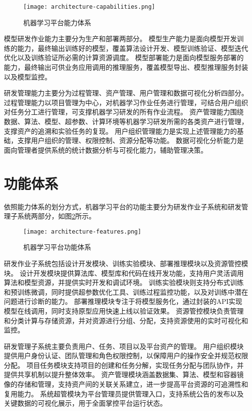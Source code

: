\begin{figure}
  \centering
  \texttt{[image: architecture-capabilities.png]}
  \caption{机器学习平台能力体系}
  \label{fig:architecture-capabilities}
\end{figure}

模型研发作业能力主要分为生产和部署两部分。
模型生产能力是面向模型开发训练的能力，最终输出训练好的模型，覆盖算法设计开发、模型训练验证、模型迭代优化以及训练验证所必需的计算资源调度。
模型部署能力是面向模型服务部署的能力，最终输出可供业务应用调用的推理服务，覆盖模型导出、模型推理服务封装以及模型监控。

研发管理能力主要分为过程管理、资产管理、用户管理和数据可视化分析四部分。
过程管理能力以项目管理为中心，对机器学习作业任务进行管理，可结合用户组织对任务分工进行管理，可支撑机器学习研发的所有作业流程。
资产管理能力围绕数据、算法、模型、超参数、计算环境等机器学习研发所需的各类资产进行管理，支撑资产的追溯和实验任务的复现。
用户组织管理能力是实现上述管理能力的基础，支撑用户组织的管理、权限控制、资源分配等功能。
数据可视化分析能力是面向管理者提供系统的统计数据分析与可视化能力，辅助管理决策。


\section{功能体系}

依照能力体系的划分方式，机器学习平台的功能主要分为研发作业子系统和研发管理子系统两部分，如图\ref{fig:architecture-features}所示。

\begin{figure}
  \centering
  \texttt{[image: architecture-features.png]}
  \caption{机器学习平台功能体系}
  \label{fig:architecture-features}
\end{figure}

研发作业子系统包括设计开发模块、训练实验模块、部署推理模块以及资源管控模块。
设计开发模块提供算法库、模型库和代码在线开发功能，支持用户灵活调用算法和模型资源，并提供实时开发和调试环境。
训练实验模块则支持分布式训练和预训练微调，同时提供超参数优化工具、训练过程监控功能，以及对训练中潜在问题进行诊断的能力。
部署推理模块专注于将模型服务化，通过封装的API实现模型在线调用，同时支持原型应用快速上线以验证效果。
资源管控模块负责管理和分类计算与存储资源，并对资源进行分组、分配，支持资源使用的实时可视化和监控。

研发管理子系统主要负责用户、任务、项目以及平台资产的管理。
用户组织模块提供用户身份认证、团队管理和角色权限控制，以保障用户的操作安全并规范权限分配。
项目任务模块支持项目的创建和任务分解，实现任务分配与团队协作，并提供共享机制以提升整体效率。
资产管理模块涵盖数据集、算法、模型和容器镜像的存储和管理，支持资产间的关联关系建立，进一步提高平台资源的可追溯性和复用能力。
系统超管模块为平台管理员提供管理入口，支持系统公告的发布以及关键数据的可视化展示，用于全面掌控平台运行状态。


